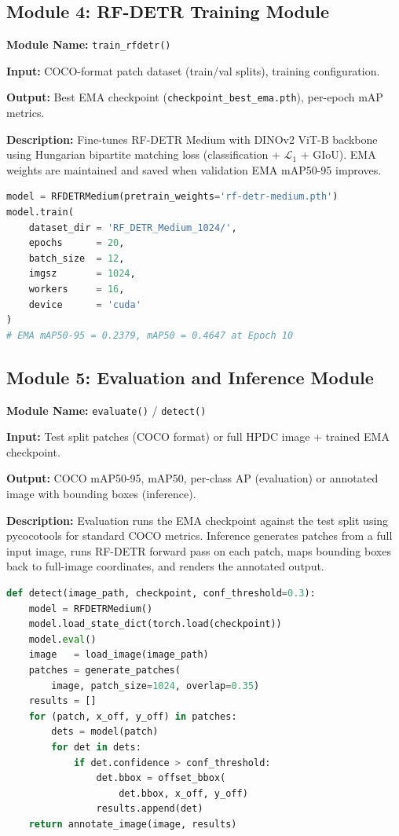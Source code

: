 \subsection{Module 4: RF-DETR Training Module}

\textbf{Module Name:} \texttt{train\_rfdetr()}

\textbf{Input:} COCO-format patch dataset (train/val splits), training configuration.

\textbf{Output:} Best EMA checkpoint (\texttt{checkpoint\_best\_ema.pth}), per-epoch mAP metrics.

\textbf{Description:} Fine-tunes RF-DETR Medium with DINOv2 ViT-B backbone using Hungarian bipartite matching loss (classification + $\mathcal{L}_1$ + GIoU). EMA weights are maintained and saved when validation EMA mAP50-95 improves.

\begin{lstlisting}[language=Python, caption={RF-DETR training configuration (Experiment 7)}]
model = RFDETRMedium(pretrain_weights='rf-detr-medium.pth')
model.train(
    dataset_dir = 'RF_DETR_Medium_1024/',
    epochs      = 20,
    batch_size  = 12,
    imgsz       = 1024,
    workers     = 16,
    device      = 'cuda'
)
# EMA mAP50-95 = 0.2379, mAP50 = 0.4647 at Epoch 10
\end{lstlisting}

\subsection{Module 5: Evaluation and Inference Module}

\textbf{Module Name:} \texttt{evaluate()} / \texttt{detect()}

\textbf{Input:} Test split patches (COCO format) or full HPDC image + trained EMA checkpoint.

\textbf{Output:} COCO mAP50-95, mAP50, per-class AP (evaluation) or annotated image with bounding boxes (inference).

\textbf{Description:} Evaluation runs the EMA checkpoint against the test split using pycocotools for standard COCO metrics. Inference generates patches from a full input image, runs RF-DETR forward pass on each patch, maps bounding boxes back to full-image coordinates, and renders the annotated output.

\begin{lstlisting}[language=Python, caption={Inference pseudocode}]
def detect(image_path, checkpoint, conf_threshold=0.3):
    model = RFDETRMedium()
    model.load_state_dict(torch.load(checkpoint))
    model.eval()
    image   = load_image(image_path)
    patches = generate_patches(
        image, patch_size=1024, overlap=0.35)
    results = []
    for (patch, x_off, y_off) in patches:
        dets = model(patch)
        for det in dets:
            if det.confidence > conf_threshold:
                det.bbox = offset_bbox(
                    det.bbox, x_off, y_off)
                results.append(det)
    return annotate_image(image, results)
\end{lstlisting}

